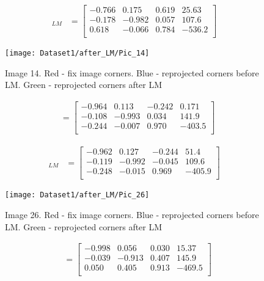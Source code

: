 \documentclass[11pt]{article}
\begin{document}
\begin{align*}
[\mathbf{R}|t]_{LM} &= \begin{bmatrix} 
-0.766 & 0.175 & 0.619 & 25.63 \\
-0.178 & -0.982 & 0.057 & 107.6 \\
0.618 & -0.066 & 0.784 & -536.2\\
\end{bmatrix}
\end{align*}

\begin{figure}[H]
\centering
\texttt{[image: Dataset1/after\_LM/Pic\_14]}
\caption{Image 14. Red - fix image corners. Blue - reprojected corners before LM. Green - reprojected corners after LM}
\label{}
\end{figure}

\begin{align*}
[\mathbf{R}|t] &= \begin{bmatrix} 
-0.964 & 0.113 & -0.242 & 0.171 \\
-0.108 & -0.993 & 0.034 & 141.9 \\
-0.244 & -0.007 & 0.970 & -403.5\\
\end{bmatrix}
\end{align*}

\begin{align*}
[\mathbf{R}|t]_{LM} &= \begin{bmatrix} 
-0.962 & 0.127 & -0.244 & 51.4 \\
-0.119 & -0.992 & -0.045 & 109.6 \\
-0.248 & -0.015 & 0.969 & -405.9\\
\end{bmatrix}
\end{align*}

\begin{figure}[H]
\centering
\texttt{[image: Dataset1/after\_LM/Pic\_26]}
\caption{Image 26. Red - fix image corners. Blue - reprojected corners before LM. Green - reprojected corners after LM}
\label{}
\end{figure}

\begin{align*}
[\mathbf{R}|t] &= \begin{bmatrix} 
-0.998 & 0.056 & 0.030 & 15.37 \\
-0.039 & -0.913 & 0.407 & 145.9 \\
0.050 & 0.405 & 0.913 & -469.5\\
\end{bmatrix}
\end{align*}
\end{document}
